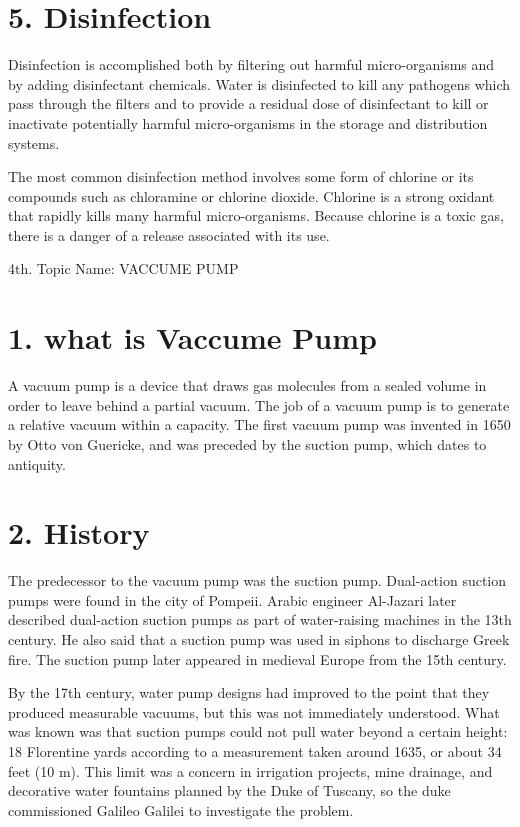 \documentclass[12pt]{article}
\begin{document}
\section*{5.  Disinfection}
Disinfection is accomplished both by filtering out harmful micro-organisms and by adding disinfectant chemicals. Water is disinfected to kill any pathogens which pass through the filters and to provide a residual dose of disinfectant to kill or inactivate potentially harmful micro-organisms in the storage and distribution systems. 

The most common disinfection method involves some form of chlorine or its compounds such as chloramine or chlorine dioxide. Chlorine is a strong oxidant that rapidly kills many harmful micro-organisms. Because chlorine is a toxic gas, there is a danger of a release associated with its use.



\maketitle
\clearpage
4th. Topic Name:  VACCUME PUMP 

\section*{1.  what is Vaccume Pump}
A vacuum pump is a device that draws gas molecules from a sealed volume in order to leave behind a partial vacuum. The job of a vacuum pump is to generate a relative vacuum within a capacity. The first vacuum pump was invented in 1650 by Otto von Guericke, and was preceded by the suction pump, which dates to antiquity.

\section*{2.  History}
The predecessor to the vacuum pump was the suction pump. Dual-action suction pumps were found in the city of Pompeii. Arabic engineer Al-Jazari later described dual-action suction pumps as part of water-raising machines in the 13th century. He also said that a suction pump was used in siphons to discharge Greek fire. The suction pump later appeared in medieval Europe from the 15th century.

By the 17th century, water pump designs had improved to the point that they produced measurable vacuums, but this was not immediately understood. What was known was that suction pumps could not pull water beyond a certain height: 18 Florentine yards according to a measurement taken around 1635, or about 34 feet (10 m). This limit was a concern in irrigation projects, mine drainage, and decorative water fountains planned by the Duke of Tuscany, so the duke commissioned Galileo Galilei to investigate the problem.
\end{document}
